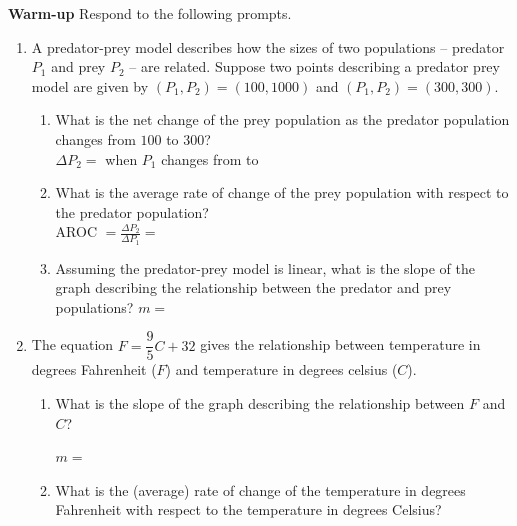 \documentclass[10pt]{article}
\begin{document}
{\bf\color{blue}Warm-up }Respond to the following prompts.\\
    \begin{enumerate}
    \item[(a)] A predator-prey model describes how the sizes of two populations -- predator $P_1$ and prey $P_2$ -- are related. Suppose two points describing a predator prey model are given by $(P_1,P_2)=(100,1000)$ and $(P_1,P_2)=(300,300)$.
        \begin{enumerate}
        \item[i.] What is the net change of the prey population as the predator population changes from $100$ to $300$?\\

            {\Large $\Delta P_2=$ when $P_1$ changes from to   } 
        \item[ii.] What is the average rate of change of the prey population with respect to the predator population?\\    

            {\Large AROC $=\frac{\Delta P_2}{\Delta P_1}=$ } %
        \item[iii.] Assuming the predator-prey model is linear, what is the slope of the graph describing the relationship between the predator and prey populations?
            {\Large $m=$  }
        \end{enumerate}
    \item[(b)] The equation $F=\dfrac95C+32$ gives the relationship between temperature in degrees Fahrenheit ($F$) and temperature in degrees celsius ($C$). 
        \begin{enumerate}
        \item[i.] What is the slope of the graph describing the relationship between $F$ and $C$?\\
        \begin{center}    {\Large $m=$ } \end{center}
        \item[ii.] What is the (average) rate of change of the temperature in degrees Fahrenheit with respect to the temperature in degrees Celsius?\\
            

\end{enumerate}
\end{enumerate}
\end{document}
